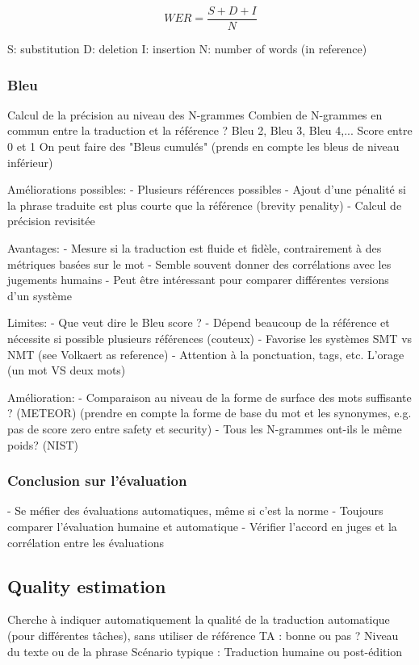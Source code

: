 $$WER = \frac{S+D+I}{N}$$

S: substitution
D: deletion
I: insertion
N: number of words (in reference)

\subsubsection{Bleu}

Calcul de la précision au niveau des N-grammes
Combien de N-grammes en commun entre la traduction et la référence ?
Bleu 2, Bleu 3, Bleu 4,...
Score entre 0 et 1
On peut faire des "Bleus cumulés" (prends en compte les bleus de niveau inférieur)

Améliorations possibles:
- Plusieurs références possibles
- Ajout d’une pénalité si la phrase traduite est plus courte que la référence (brevity penality)
- Calcul de précision revisitée

Avantages:
- Mesure si la traduction est fluide et fidèle, contrairement à des métriques basées sur le mot
- Semble souvent donner des corrélations avec les jugements humains
- Peut être intéressant pour comparer différentes versions d’un système

Limites:
- Que veut dire le Bleu score ?
- Dépend beaucoup de la référence et nécessite si possible plusieurs références (couteux)
- Favorise les systèmes SMT vs NMT (see Volkaert as reference)
- Attention à la ponctuation, tags, etc.
    L’orage (un mot VS deux mots)

Amélioration:
- Comparaison au niveau de la forme de surface des mots suffisante ? (METEOR) (prendre en compte la forme de base du mot et les synonymes, e.g. pas de score zero entre safety et security)
- Tous les N-grammes ont-ils le même poids? (NIST)

\subsubsection{Conclusion sur l'évaluation}

- Se méfier des évaluations automatiques, même si c’est la norme
- Toujours comparer l’évaluation humaine et automatique
- Vérifier l’accord en juges et la corrélation entre les évaluations

\subsection{Quality estimation}

Cherche à indiquer automatiquement la qualité de la traduction automatique (pour différentes tâches), sans utiliser de référence
    TA : bonne ou pas ?
    Niveau du texte ou de la phrase
Scénario typique : Traduction humaine ou post-édition


